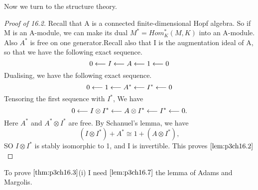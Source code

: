 \documentclass[../main]{subfiles}
\begin{document}
Now we turn to the structure theory.

\begin{proof}[Proof of 16.2] Recall that A is a connected finite-dimensional
Hopf algebra. So if M is an A-module, we can make its dual $M^{\ast}=Hom_{K}^{\ast}(M,K)$ into an A-module. Also $A^{\ast}$ is free on one generator.Recall also that I is the augmentation ideal of A, so that we have the
following exact sequence. \begin{equation*} 
    0 \overset{}{\longleftarrow} I \overset{}{\longleftarrow} A \overset{}{\longleftarrow} 1 \overset{}{\longleftarrow} 0
\end{equation*}
Dualising, we have the following exact sequence. 
\begin{equation*}
    0 \overset{}{\longleftarrow} 1 \overset{}{\longleftarrow} A^{\ast} \overset{}{\longleftarrow} I^{\ast} \overset{}{\longleftarrow} 0
\end{equation*}
Tensoring the first sequence with $I^{\ast}$, We have \begin{equation*}
    0 \overset{}{\longleftarrow} I\otimes I^{\ast} \overset{}{\longleftarrow} A\otimes I^{\ast} \overset{}{\longleftarrow} I^{\ast} \overset{}{\longleftarrow} 0.
\end{equation*}
Here $A^{\ast}$ and $A^{\ast}\otimes I^{\ast}$ are free. By Schanuel's lemma, we have \begin{equation*}
    \left(I\otimes I^{\ast}\right)+ A^{\ast}\cong 1+(A\otimes I^{\ast}),
\end{equation*}
SO $I\otimes I^{\ast}$ is stably isomorphic to 1, and I is invertible. This proves $\ref{lem:p3ch16.2}$
\end{proof}
To prove $\ref{thm:p3ch16.3}$(i) I need $\ref{lem:p3ch16.7}$ the lemma of Adams and Margolis.
\end{document}
